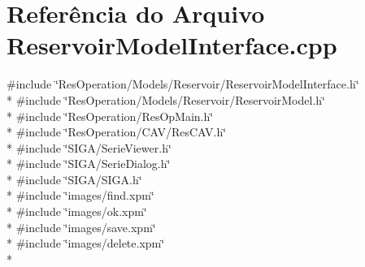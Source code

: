 \section{Referência do Arquivo Reservoir\+Model\+Interface.\+cpp}
\label{_reservoir_model_interface_8cpp}
{\ttfamily \#include \char`\"{}Res\+Operation/\+Models/\+Reservoir/\+Reservoir\+Model\+Interface.\+h\char`\"{}}\\*
{\ttfamily \#include \char`\"{}Res\+Operation/\+Models/\+Reservoir/\+Reservoir\+Model.\+h\char`\"{}}\\*
{\ttfamily \#include \char`\"{}Res\+Operation/\+Res\+Op\+Main.\+h\char`\"{}}\\*
{\ttfamily \#include \char`\"{}Res\+Operation/\+C\+A\+V/\+Res\+C\+A\+V.\+h\char`\"{}}\\*
{\ttfamily \#include \char`\"{}S\+I\+G\+A/\+Serie\+Viewer.\+h\char`\"{}}\\*
{\ttfamily \#include \char`\"{}S\+I\+G\+A/\+Serie\+Dialog.\+h\char`\"{}}\\*
{\ttfamily \#include \char`\"{}S\+I\+G\+A/\+S\+I\+G\+A.\+h\char`\"{}}\\*
{\ttfamily \#include \char`\"{}images/find.\+xpm\char`\"{}}\\*
{\ttfamily \#include \char`\"{}images/ok.\+xpm\char`\"{}}\\*
{\ttfamily \#include \char`\"{}images/save.\+xpm\char`\"{}}\\*
{\ttfamily \#include \char`\"{}images/delete.\+xpm\char`\"{}}\\*

